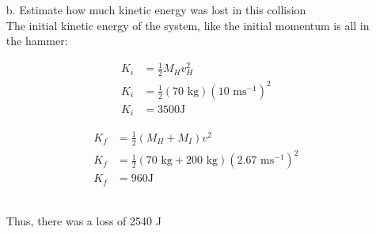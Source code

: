 \documentclass[a4paper]{article}
\begin{document}
\begin{shaded}
\begin{itemize}
        \item[b.] Estimate how much kinetic energy was lost in this collision\\
        The initial kinetic energy of the system, like the initial momentum is all in the hammer:\\
        \begin{minipage}{0.4\textwidth}
            \begin{align*}
                K_i &= \frac{1}{2}M_H v_H^2\\
                K_i &= \frac{1}{2}(70\text{ kg})(10\text{ ms}^{-1})^2\\
                K_i &= 3500\text{J}
            \end{align*}
        \end{minipage}
        \begin{minipage}{0.4\textwidth}
            \begin{align*}
                K_f &= \frac{1}{2}(M_H + M_I)v^2\\
                K_f &= \frac{1}{2}(70\text{ kg} + 200\text{ kg})(2.67\text{ ms}^{-1})^2\\
                K_f &= 960\text{J}
            \end{align*}
        \end{minipage}\\
        Thus, there was a loss of 2540 J
    \end{itemize}
\end{shaded}
\end{document}
